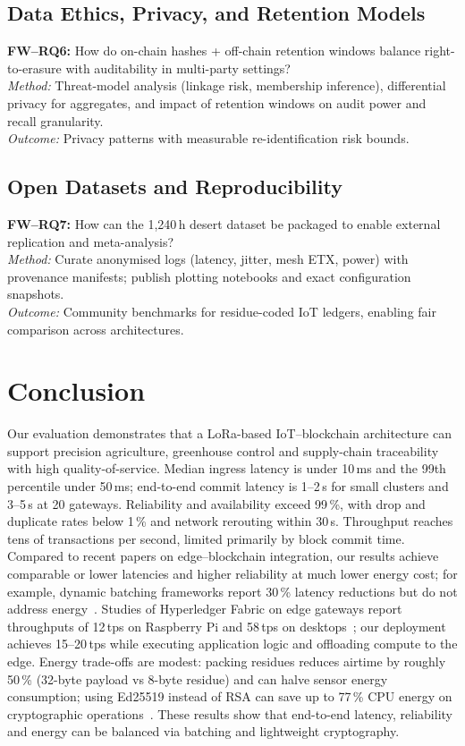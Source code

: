\documentclass[12pt,onecolumn]{IEEEtran} %
\begin{document}
\subsection{Data Ethics, Privacy, and Retention Models}
\textbf{FW–RQ6:} How do on-chain hashes + off-chain retention windows balance right-to-erasure with auditability in multi-party settings? \\
\textit{Method:} Threat-model analysis (linkage risk, membership inference), differential privacy for aggregates, and impact of retention windows on audit power and recall granularity. \\
\textit{Outcome:} Privacy patterns with measurable re-identification risk bounds.

\subsection{Open Datasets and Reproducibility}
\textbf{FW–RQ7:} How can the 1{,}240\,h desert dataset be packaged to enable external replication and meta-analysis? \\
\textit{Method:} Curate anonymised logs (latency, jitter, mesh ETX, power) with provenance manifests; publish plotting notebooks and exact configuration snapshots. \\
\textit{Outcome:} Community benchmarks for residue-coded IoT ledgers, enabling fair comparison across architectures.

\section{Conclusion}
\label{sec:conclusion}

Our evaluation demonstrates that a LoRa-based IoT–blockchain architecture can support precision agriculture, greenhouse control and supply-chain traceability with high quality-of-service. Median ingress latency is under 10\,ms and the 99th percentile under 50\,ms; end-to-end commit latency is 1–2\,s for small clusters and 3–5\,s at 20 gateways. Reliability and availability exceed 99\,\%, with drop and duplicate rates below 1\,\% and network rerouting within 30\,s. Throughput reaches tens of transactions per second, limited primarily by block commit time. Compared to recent papers on edge–blockchain integration, our results achieve comparable or lower latencies and higher reliability at much lower energy cost; for example, dynamic batching frameworks report 30\,\% latency reductions but do not address energy~\cite{batchit_2024}. Studies of Hyperledger Fabric on edge gateways report throughputs of 12\,tps on Raspberry Pi and 58\,tps on desktops~\cite{melo2025comprehensive}; our deployment achieves 15–20\,tps while executing application logic and offloading compute to the edge. Energy trade-offs are modest: packing residues reduces airtime by roughly 50\,\% (32-byte payload vs 8-byte residue) and can halve sensor energy consumption; using Ed25519 instead of RSA can save up to 77\,\% CPU energy on cryptographic operations~\cite{klaassen_2025}. These results show that end-to-end latency, reliability and energy can be balanced via batching and lightweight cryptography.
\end{document}
